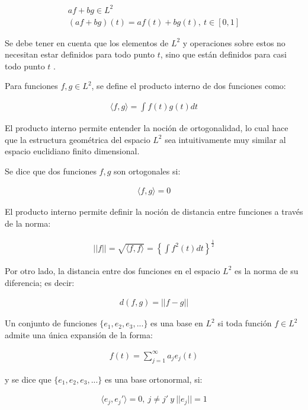 \documentclass[
]{book}
\begin{document}
\begin{align}
        af+bg\in L^2\hspace{2cm}\\
         (af+bg)(t)=af(t)+bg(t),\ t \in [0,1]
  \end{align}

Se debe tener en cuenta que los elementos de \(L^2\) y operaciones sobre estos no necesitan estar definidos para todo punto \(t\), sino que están definidos para casi todo punto \(t\) \citep{kokoska}.

Para funciones \(f,g\in L^2\), se define el producto interno de dos funciones como:

\begin{align}
    \langle f,g \rangle=\int f(t)g(t)dt
\end{align}

El producto interno permite entender la noción de ortogonalidad, lo cual hace que la estructura geométrica del espacio \(L^2\) sea intuitivamente muy similar al espacio euclidiano finito dimensional.

Se dice que dos funciones \(f,g\) son ortogonales si:

\begin{align}
    \langle f,g \rangle=0
\end{align}

El producto interno permite definir la noción de distancia entre funciones a través de la norma:

\begin{align}
  ||f||=\sqrt{\langle f,f \rangle}=\left\{\int f^2 (t) dt \right\}^{\frac{1}{2}}
\end{align}

Por otro lado, la distancia entre dos funciones en el espacio \(L^2\) es la norma de su diferencia; es decir:

\begin{align}
    d(f,g)=||f-g||
\end{align}

Un conjunto de funciones \(\{e_1,e_2,e_3,...\}\) es una base en \(L^2\) si toda función \(f\in L^2\) admite una única expansión de la forma:

\begin{align}
    f(t)=\sum_{j=1}^\infty {a_je_j(t)}
\end{align}

y se dice que \(\{e_1,e_2,e_3,...\}\) es una base ortonormal, si:

\begin{align}
    \langle e_j,e_j' \rangle =0,\ j\neq j' \ y\ ||e_j||=1
\end{align}
\end{document}
